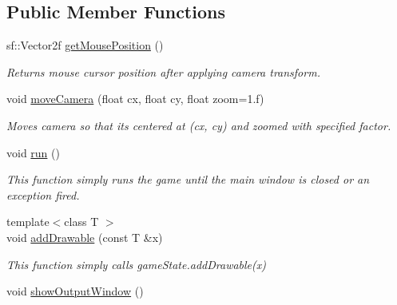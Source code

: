 \subsection*{Public Member Functions}
\begin{DoxyCompactItemize}
\item 
sf\+::\+Vector2f \hyperlink{classGame_a34b9f33fe8fb922224b95e50795629c2}{get\+Mouse\+Position} ()\hypertarget{classGame_a34b9f33fe8fb922224b95e50795629c2}{}\label{classGame_a34b9f33fe8fb922224b95e50795629c2}

\begin{DoxyCompactList}\small\item\em Returns mouse cursor position after applying camera transform. \end{DoxyCompactList}\item 
void \hyperlink{classGame_a401542d59b5346cba650367e548626ce}{move\+Camera} (float cx, float cy, float zoom=1.f)
\begin{DoxyCompactList}\small\item\em Moves camera so that its centered at (cx, cy) and zoomed with specified factor. \end{DoxyCompactList}\item 
void \hyperlink{classGame_a1ab78f5ed0d5ea879157357cf2fb2afa}{run} ()\hypertarget{classGame_a1ab78f5ed0d5ea879157357cf2fb2afa}{}\label{classGame_a1ab78f5ed0d5ea879157357cf2fb2afa}

\begin{DoxyCompactList}\small\item\em This function simply runs the game until the main window is closed or an exception fired. \end{DoxyCompactList}\item 
{\footnotesize template$<$class T $>$ }\\void \hyperlink{classGame_a17b8b67b1ebc97d05b97925bfe53b61f}{add\+Drawable} (const T \&x)\hypertarget{classGame_a17b8b67b1ebc97d05b97925bfe53b61f}{}\label{classGame_a17b8b67b1ebc97d05b97925bfe53b61f}

\begin{DoxyCompactList}\small\item\em This function simply calls game\+State.\+add\+Drawable(x) \end{DoxyCompactList}\item 
void \hyperlink{classGame_a52ebfe7608394f1281efb3032d059967}{show\+Output\+Window} ()\hypertarget{classGame_a52ebfe7608394f1281efb3032d059967}{}\label{classGame_a52ebfe7608394f1281efb3032d059967}


\end{DoxyCompactItemize}
